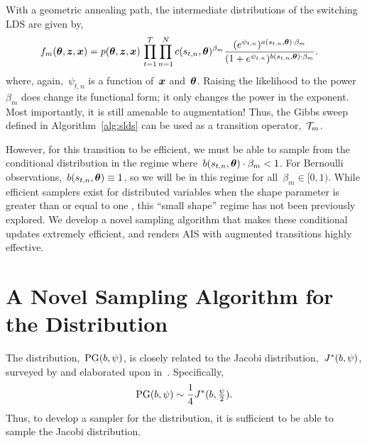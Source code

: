 With a geometric annealing path, the intermediate distributions of the 
switching LDS are given by,
\begin{align}
  \label{eq:intermediate}
  f_m(\boldsymbol{\theta}, \boldsymbol{z}, \boldsymbol{x}) 
  &= p(\boldsymbol{\theta}, \boldsymbol{z}, \boldsymbol{x}) \,  
    \prod_{t=1}^T \prod_{n=1}^N
    c(s_{t,n}, \boldsymbol{\theta})^{\beta_m} \frac{(e^{\psi_{t,n}})^{a(s_{t,n}, \boldsymbol{\theta}) \cdot \beta_m}}
    {(1+e^{\psi_{t,n}})^{b(s_{t,n}, \boldsymbol{\theta}) \cdot \beta_m}}.
\end{align}
where, again,~$\psi_{t,n}$ is a function of~$\boldsymbol{x}$ and~$\boldsymbol{\theta}$.
Raising the likelihood to the power~$\beta_m$ does change its
functional form; it only changes the power in the exponent.
Most importantly, it is still amenable to \polyagamma augmentation!
Thus, the Gibbs sweep defined in Algorithm~\ref{alg:slds} can be used as
a transition operator,~$\mathcal{T}_m$.

However, for this transition to be efficient, we must be able to
sample from the \polyagamma conditional distribution in the regime
where~${b(s_{t,n}, \boldsymbol{\theta}) \cdot \beta_m < 1}$.  For Bernoulli
observations,~${b(s_{t,n}, \boldsymbol{\theta}) \equiv 1}$, so we will be in this
regime for all~$\beta_m \in [0,1)$.  While efficient samplers exist
for \polyagamma distributed variables when the shape parameter is
greater than or equal to one \citep{windle2014sampling}, this ``small shape''
regime has not been previously explored.  We develop a novel sampling
algorithm that makes these conditional updates extremely efficient,
and renders AIS with \polyagamma augmented transitions highly
effective.

\section{A Novel Sampling Algorithm for the \polyagamma Distribution}
\label{sec:pgsampling}

The \polyagamma distribution,~$\mathrm{PG}(b,\psi)$, is closely related 
to the Jacobi distribution,~$J^{*}(b,\psi)$, surveyed by \citet{biane2001probability} and 
elaborated upon in~\citet{windle2014sampling}.
Specifically, 
\begin{align*}
  \mathrm{PG}(b, \psi) \sim \frac{1}{4} J^{*}(b, \tfrac{\psi}{2}).
\end{align*}
Thus, to develop a sampler for the \polyagamma distribution, 
it is sufficient to be able to sample the Jacobi distribution.

